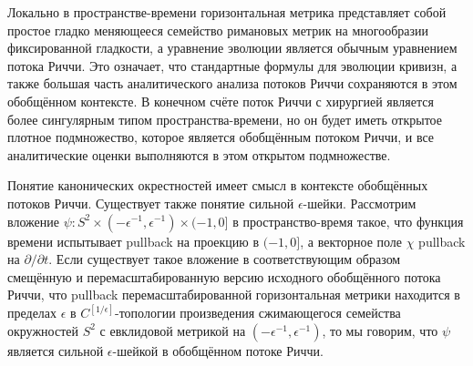 Локально в пространстве-времени горизонтальная метрика 
представляет собой простое гладко меняющееся семейство 
римановых метрик на многообразии фиксированной гладкости, 
а уравнение эволюции является обычным уравнением потока 
Риччи. Это означает, что стандартные формулы для эволюции 
кривизн, а также большая часть аналитического анализа 
потоков Риччи сохраняются в этом обобщённом контексте. 
В конечном счёте поток Риччи с хирургией является более 
сингулярным типом пространства-времени, но он будет иметь 
открытое плотное подмножество, которое является 
обобщённым потоком Риччи, и все аналитические оценки 
выполняются в этом открытом подмножестве.

Понятие канонических окрестностей имеет смысл в контексте 
обобщённых потоков Риччи. Существует также понятие сильной 
$ \epsilon $-шейки. Рассмотрим вложение 
$ \psi : S^2 \times (-\epsilon^{-1}, \epsilon^{-1}) \times (-1, 0] $ 
в пространство-время такое, что функция времени испытывает pullback 
на проекцию в $ (-1, 0] $, а векторное поле $ \chi $ 
pullback на $ \partial / \partial t $. Если существует 
такое вложение в соответствующим образом смещённую и 
перемасштабированную версию исходного обобщённого потока Риччи, 
что pullback перемасштабированной горизонтальная метрики 
находится в пределах $ \epsilon $ в $ C^{[1/\epsilon]} $-топологии 
произведения сжимающегося семейства окружностей $ S^2 $ с евклидовой 
метрикой на $ (-\epsilon^{-1}, \epsilon^{-1}) $, то мы говорим, 
что $ \psi $ является сильной $ \epsilon $-шейкой в обобщённом 
потоке Риччи.
